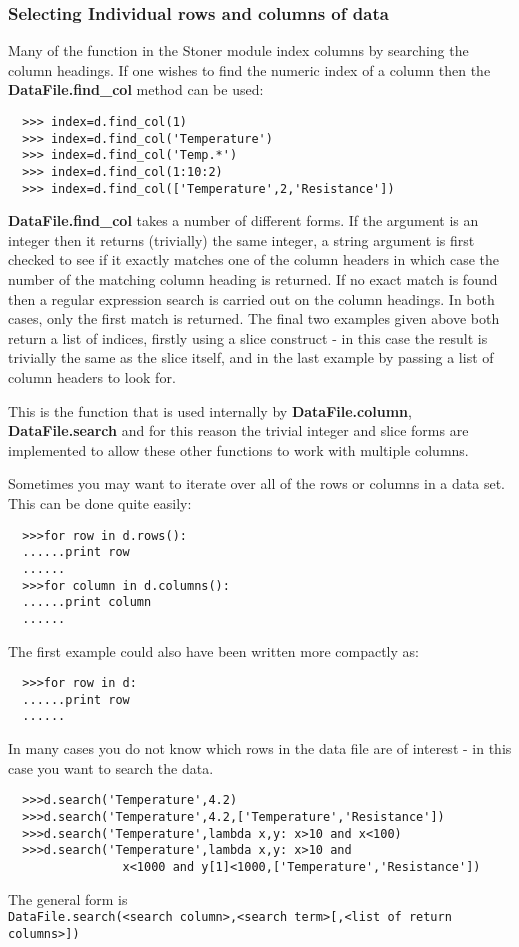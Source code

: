 \documentclass[a4paper,11pt]{scrartcl}
\begin{document}
\subsubsection{Selecting Individual rows and columns of data}

Many of the function in the Stoner module index columns by searching the column headings. If one wishes to find the numeric index of a column then the \textbf{DataFile.find\_col} method can be used:

\begin{verbatim}
  >>> index=d.find_col(1)
  >>> index=d.find_col('Temperature')
  >>> index=d.find_col('Temp.*')
  >>> index=d.find_col(1:10:2)
  >>> index=d.find_col(['Temperature',2,'Resistance'])
\end{verbatim}

 \textbf{DataFile.find\_col} takes a number of different forms. If the argument is an integer then it returns (trivially) the same integer, a string argument is first checked to see if it exactly matches one of the column headers in which case the number of the matching column heading is returned. If no exact match is found then a regular expression search is carried out on the column headings. In both cases, only the first match is returned. The final two examples given above both return a list of indices, firstly using a slice construct - in this case the result is trivially the same as the slice itself, and in the last example by passing a list of column headers to look for.

This is the function that is used internally by \textbf{DataFile.column}, \textbf{DataFile.search} \etc and for this reason the trivial integer and slice forms are implemented to allow these other functions to work with multiple columns.

Sometimes you may want to iterate over all of the rows or columns in a data set. This can be done quite easily:
\begin{verbatim}
  >>>for row in d.rows():
  ......print row
  ......
  >>>for column in d.columns():
  ......print column
  ......
\end{verbatim}
The first example could also have been written more compactly as:
\begin{verbatim}
  >>>for row in d:
  ......print row
  ......
\end{verbatim}

In many cases you do not know which rows in the data file are of interest - in this case you want to search the data.
\begin{verbatim}
  >>>d.search('Temperature',4.2)
  >>>d.search('Temperature',4.2,['Temperature','Resistance'])
  >>>d.search('Temperature',lambda x,y: x>10 and x<100)
  >>>d.search('Temperature',lambda x,y: x>10 and
                x<1000 and y[1]<1000,['Temperature','Resistance'])
\end{verbatim}
The general form is \\\verb:DataFile.search(<search column>,<search term>[,<list of return columns>]):
\end{document}
